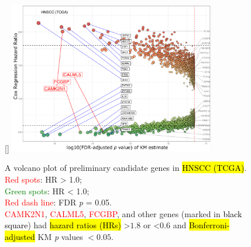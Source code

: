 \documentclass[
paper=landscape,
paper=160mm:90mm, %
fontsize=11pt, %
pagesize, %
parskip=half-, %
]{scrartcl} %
\theoremstyle{mythmstyle} %
\begin{document}

\clearpage

\thispagestyle{headings}

\begin{figure}[ht]

[\FBwidth]
{    \includegraphics[width=9cm]{Rplot_TCGA_HNSCC_CoxHR_CAMK2N1_top3FDRKM.pdf}}
{\captionsetup{labelformat=empty}    
\caption{A volcano plot of preliminary candidate genes in \hl{HNSCC (TCGA)}.\\
    \textcolor{red}{Red spots}: HR > 1.0;\\
    \textcolor{green}{Green spots}: HR < 1.0;\\
    \textcolor{red}{Red dash line}: FDR \textit{p} = 0.05.\\
    \textcolor{red}{CAMK2N1}, \textcolor{red}{CALML5}, \textcolor{red}{FCGBP}, and  other genes (marked in \textcolor{black}{black square}) had \hl{hazard ratios (HRs)} >$1.8$ or <$0.6$ and \hl{Bonferroni-adjusted} KM \textit{p} values $< 0.05$.
    }}
\end{figure}
\end{document}
